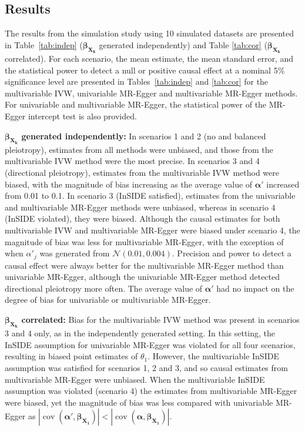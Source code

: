 \documentclass[a4paper,12pt]{article}
\DeclareMathOperator{\cov}{cov}
\begin{document}
\begin{bibunit}[wileyj]
\subsection{Results} %
\label{sec:simulation_results}
\label{sec:results}
The results from the simulation study using 10 simulated datasets are presented in Table~\ref{tab:indep} ($\boldsymbol{\beta_{X_{k}}}$ generated independently) and Table \ref{tab:cor} ($\boldsymbol{\beta_{X_{k}}}$ correlated). For each scenario, the mean estimate, the mean standard error, and the statistical power to detect a null or positive causal effect at a nominal 5\% significance level are presented in Tables~\ref{tab:indep} and \ref{tab:cor} for the multivariable IVW, univariable MR-Egger and multivariable MR-Egger methods. For univariable and multivariable MR-Egger, the statistical power of the MR-Egger intercept test is also provided.  

\textbf{$\boldsymbol{\beta_{X_{k}}}$ generated independently:} In scenarios 1 and 2 (no and balanced pleiotropy), estimates from all methods were unbiased, and those from the multivariable IVW method were the most precise. In scenarios 3 and 4 (directional pleiotropy), estimates from the multivariable IVW method were biased, with the magnitude of bias increasing as the average value of $\boldsymbol{\alpha'}$ increased from 0.01 to 0.1. In scenario 3 (InSIDE satisfied), estimates from the univariable and multivariable MR-Egger methods were unbiased, whereas in scenario 4 (InSIDE violated), they were biased. Although the causal estimates for both multivariable IVW and multivariable MR-Egger were biased under scenario 4, the magnitude of bias was less for multivariable MR-Egger, with the exception of when $\alpha'_j$ was generated from $\mathcal{N}(0.01,0.004)$. Precision and power to detect a causal effect were always better for the multivariable MR-Egger method than univariable MR-Egger, although the univariable MR-Egger method detected directional pleiotropy more often. The average value of $\boldsymbol{\alpha'}$ had no impact on the degree of bias for univariable or multivariable MR-Egger.

\textbf{$\boldsymbol{\beta_{X_{k}}}$ correlated:} Bias for the multivariable IVW method was present in scenarios 3 and 4 only, as in the independently generated setting. In this setting, the InSIDE assumption for univariable MR-Egger was violated for all four scenarios, resulting in biased point estimates of $\theta_1$. However, the multivariable InSIDE assumption was satisfied for scenarios 1, 2 and 3, and so causal estimates from multivariable MR-Egger were unbiased. When the multivariable InSIDE assumption was violated (scenario 4) the estimates from multivariable MR-Egger were biased, yet the magnitude of bias was less compared with univariable MR-Egger as $|\cov(\boldsymbol{\alpha'},\boldsymbol{\beta_{X_{1}}})|< |\cov(\boldsymbol{\alpha},\boldsymbol{\beta_{X_{1}}})|$.


\end{bibunit}
\end{document}
